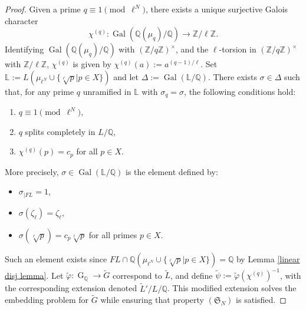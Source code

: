 \documentclass[10pt,a4paper]{amsart}
\newcommand{\Q}{\mathbb{Q}}
\newcommand{\Z}{\mathbb{Z}}
\newcommand{\op}[1]{\operatorname{#1}}
\begin{document}
\begin{proof}
  Given a prime $q\equiv 1\pmod{\ell^N}$, there exists a unique surjective Galois character \[\chi^{(q)}:\op{Gal}(\Q(\mu_q)/\Q)\rightarrow \Z/\ell\Z.\] Identifying $\op{Gal}(\Q(\mu_q)/\Q)$ with $(\Z/q\Z)^\times$, and the $\ell$-torsion in $(\Z/q\Z)^\times$ with $\Z/\ell\Z$, $\chi^{(q)}$ is given by $\chi^{(q)}(a):=a^{(q-1)/\ell}$. Set \(\mathbb{L} := L\left(\mu_{\ell^N}\cup \{\sqrt[\ell]{p}| p
\in X\}\right)\) and let \(\Delta := \operatorname{Gal}(\mathbb{L}/\mathbb{Q})\). There exists \(\sigma\in \Delta\) such that, for any prime \(q\) unramified in \(\mathbb{L}\) with \(\sigma_q =\sigma\), the following conditions hold:

\begin{enumerate}
    \item \(q \equiv 1 \pmod{\ell^N}\),
    \item \(q\) splits completely in \(L/\mathbb{Q}\),
    \item \(\chi^{(q)}(p) = c_{p}\) for all $p\in X$.
\end{enumerate}
More precisely, $\sigma\in \op{Gal}(\mathbb{L}/\Q)$ is the element defined by:
\begin{itemize}
    \item $\sigma_{|FL}=1$, 
    \item $\sigma(\zeta_\ell)=\zeta_\ell$, 
    \item $\sigma(\sqrt[\ell]{p})=c_p \sqrt[\ell]{p}$ for all primes $p\in X$.
\end{itemize}
Such an element exists since $FL\cap \Q\left(\mu_{\ell^N}\cup \{\sqrt[\ell]{p}| p
\in X\}\right)=\Q$ by Lemma \ref{linear disj lemma}. Let \(\widetilde{\varphi} : \operatorname{G}_{\mathbb{Q}} \to \widetilde{G}\) correspond to \(\widetilde{L}\), and define \(\widetilde{\psi} := \widetilde{\varphi} (\chi^{(q)})^{-1}\), with the corresponding extension denoted \(\widetilde{L}'/L/\mathbb{Q}\). This modified extension solves the embedding problem for \(\widetilde{G}\) while ensuring that property \((\mathfrak{S}_N)\) is satisfied.

\end{proof}
\end{document}
